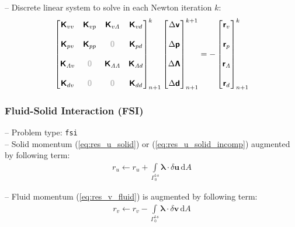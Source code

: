 \documentclass[a4paper,12pt]{report}
\newcommand{\fS}{\text{s}}
\newcommand{\fF}{\text{f}}
\newcommand{\bs}[1]{\boldsymbol{#1}}
\newcommand{\Gm}{\mathit{\Gamma}}
\newcommand{\zerom}{\textcolor{lightgray}{\bs{\mathsf{0}}}}
\newcommand{\ROP}{\bs{\mathsf{r}}}
\newcommand{\LMZ}{\bs{\mathsf{\Lambda}}}
\newcommand{\lmzi}{\mathit{\Lambda}} %
\begin{document}
-- Discrete linear system to solve in each Newton iteration $k$:
\begin{align}
\begin{bmatrix} \bs{\mathsf{K}}_{vv} & \bs{\mathsf{K}}_{vp} & \bs{\mathsf{K}}_{v\lmzi} & \bs{\mathsf{K}}_{vd} \\ \\ \bs{\mathsf{K}}_{pv} & \bs{\mathsf{K}}_{pp} & \zerom & \bs{\mathsf{K}}_{pd} \\ \\ \bs{\mathsf{K}}_{\lmzi v} & \zerom & \bs{\mathsf{K}}_{\lmzi \lmzi} & \bs{\mathsf{K}}_{\lmzi d} \\ \\ \bs{\mathsf{K}}_{dv}  & \zerom & \zerom & \bs{\mathsf{K}}_{dd} \end{bmatrix}_{n+1}^{k}\begin{bmatrix} \Delta\bs{\mathsf{v}} \\ \\ \Delta\bs{\mathsf{p}} \\ \\ \Delta\LMZ \\ \\ \Delta\bs{\mathsf{d}} \end{bmatrix}_{n+1}^{k+1}=-\begin{bmatrix} \ROP_{v} \\ \\ \ROP_{p} \\ \\ \ROP_{\lmzi} \\ \\ \ROP_{d}\end{bmatrix}_{n+1}^{k} \label{eq:lin_sys_fluid_ale_0d}
\end{align}


\subsubsection{Fluid-Solid Interaction (FSI)}\label{subsubsec:fsi}

-- Problem type: \verb"fsi"\\

-- Solid momentum (\ref{eq:res_u_solid}) or (\ref{eq:res_u_solid_incomp}) augmented by following term:
\begin{align}
r_u \leftarrow r_u + \int\limits_{\Gm_0^{\fF\text{-}\fS}}\bs{\lambda}\cdot\delta\bs{u}\,\mathrm{d}A
\end{align}

-- Fluid momentum (\ref{eq:res_v_fluid}) is augmented by following term:
\begin{align}
r_v \leftarrow r_v - \int\limits_{\Gm_0^{\fF\text{-}\fS}}\bs{\lambda}\cdot\delta\bs{v}\,\mathrm{d}A
\end{align}
\end{document}
